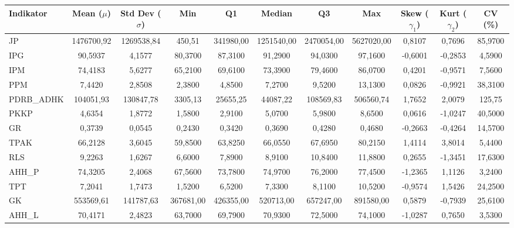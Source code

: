 \begin{adjustbox}{max width=\textwidth}
\small
\begin{tabular}{|>{\centering\arraybackslash}p{2.5cm}|c|c|c|c|c|c|c|c|c|c|}
\hline
\textbf{Indikator} & \textbf{Mean ($\mu$)} & \textbf{Std Dev ($\sigma$)} & \textbf{Min} & \textbf{Q1} & \textbf{Median} & \textbf{Q3} & \textbf{Max} & \textbf{Skew ($\gamma_1$)} & \textbf{Kurt ($\gamma_2$)} & \textbf{CV (\%)} \\
\hline
JP & 1476700,92 & 1269538,84 & 450,51 & 341980,00 & 1251540,00 & 2470054,00 & 5627020,00 & 0,8107 & 0,7696 & 85,9700 \\
IPG & 90,5937 & 4,1577 & 80,3700 & 87,3100 & 91,2900 & 94,0300 & 97,1600 & -0,6001 & -0,2853 & 4,5900 \\
IPM & 74,4183 & 5,6277 & 65,2100 & 69,6100 & 73,3900 & 79,4600 & 86,0700 & 0,4201 & -0,9571 & 7,5600 \\
PPM & 7,4420 & 2,8508 & 2,3800 & 4,8500 & 7,2700 & 9,5200 & 13,1300 & 0,0826 & -0,9921 & 38,3100 \\
PDRB\_ADHK & 104051,93 & 130847,78 & 3305,13 & 25655,25 & 44087,22 & 108569,83 & 506560,74 & 1,7652 & 2,0079 & 125,75 \\
PKKP & 4,6354 & 1,8772 & 1,5800 & 2,9100 & 5,0700 & 5,9800 & 8,6500 & 0,0616 & -1,0247 & 40,5000 \\
GR & 0,3739 & 0,0545 & 0,2430 & 0,3420 & 0,3690 & 0,4280 & 0,4680 & -0,2663 & -0,4264 & 14,5700 \\
TPAK & 66,2128 & 3,6045 & 59,8500 & 63,8250 & 66,0550 & 67,6950 & 80,2150 & 1,4114 & 3,8014 & 5,4400 \\
RLS & 9,2263 & 1,6267 & 6,6000 & 7,8900 & 8,9100 & 10,8400 & 11,8800 & 0,2655 & -1,3451 & 17,6300 \\
AHH\_P & 74,3205 & 2,4068 & 67,5600 & 73,7800 & 74,9700 & 76,2000 & 77,4500 & -1,2365 & 1,1126 & 3,2400 \\
TPT & 7,2041 & 1,7473 & 1,5200 & 6,5200 & 7,3300 & 8,1100 & 10,5200 & -0,9574 & 1,5426 & 24,2500 \\
GK & 553569,61 & 141787,63 & 367681,00 & 426355,00 & 520713,00 & 657247,00 & 891580,00 & 0,5879 & -0,7939 & 25,6100 \\
AHH\_L & 70,4171 & 2,4823 & 63,7000 & 69,7900 & 70,9300 & 72,5000 & 74,1000 & -1,0287 & 0,7650 & 3,5300 \\
\hline
\end{tabular}
\end{adjustbox}
